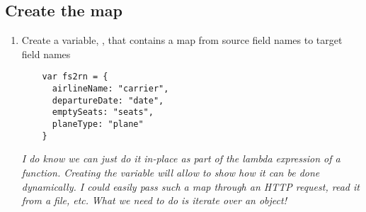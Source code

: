\subsection{Create the map}
\begin{enumerate}[resume*]
\item Create a variable, , that contains a map from source field names to target field names
  \begin{lstlisting}
    var fs2rn = {
      airlineName: "carrier",
      departureDate: "date",
      emptySeats: "seats",
      planeType: "plane"
    }
  \end{lstlisting}
  \emph{
    I do know we can just do it in-place as part of the lambda expression of a  function. Creating the variable will allow to show how it can be done dynamically.  I could easily pass such a map through an HTTP request, read it from a file, etc.
  }
  \newline
  \emph{
    What we need to do is iterate over an object!
  }
\end{enumerate}

